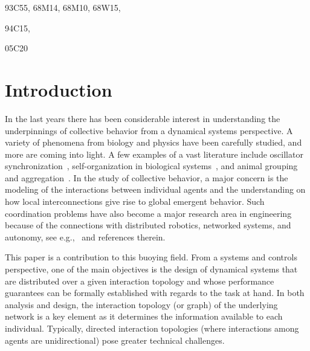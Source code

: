 \documentclass[final]{siamltex}
\begin{document}
\begin{AMS}
  93C55, 
  68M14, 
  68M10, 
  68W15, 
  
  94C15, 
  
  05C20 
  
\end{AMS}

\pagestyle{myheadings}\thispagestyle{plain}

\section{Introduction}

In the last years there has been considerable interest in
understanding the underpinnings of collective behavior from a
dynamical systems perspective. A variety of phenomena from biology and
physics have been carefully studied, and more are coming into light. A
few examples of a vast literature include oscillator
synchronization~\cite{SHS:00,SHS:03,DJTS:10}, self-organization in
biological
systems~\cite{SG-SAL:93,JKP-SVV-DG:02,SC-JLD-NRF-JS-GT-EB:01}, and
animal grouping and aggregation~\cite{AO:86,SG-SAL-DIR:96}.  In the
study of collective behavior, a major concern is the modeling of the
interactions between individual agents and the understanding on how
local interconnections give rise to global emergent behavior. Such
coordination problems have also become a major research area in
engineering because of the connections with distributed robotics,
networked systems, and autonomy, see
e.g.,~\cite{WR-RWB:08,MM-ME:10,FB-JC-SM:08cor} and references therein.

This paper is a contribution to this buoying field.  From a systems
and controls perspective, one of the main objectives is the design of
dynamical systems that are distributed over a given interaction
topology and whose performance guarantees can be formally established
with regards to the task at hand.  In both analysis and design, the
interaction topology (or graph) of the underlying network is a key
element as it determines the information available to each
individual. Typically, directed interaction topologies (where
interactions among agents are unidirectional) pose greater technical
challenges.
\end{document}
